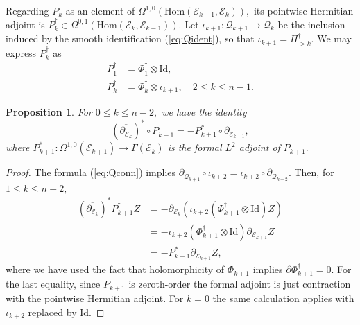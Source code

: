 \documentclass[11pt]{article}
\newtheorem{prop}[theorem]{Proposition}
\theoremstyle{definition}
\numberwithin{equation}{section}
\begin{document}
Regarding $P_k$ as an element of $\Omega^{1,0}(\mathrm{Hom}(\mathcal{E}_{k-1}, \mathcal{E}_k)),$ its pointwise Hermitian adjoint is $P_k^\dagger \in \Omega^{0,1}(\mathrm{Hom}(\mathcal{E}_k, \mathcal{E}_{k-1})).$ Let $\iota_{k+1} : \mathcal{Q}_{k+1} \to \mathcal{Q}_k$ be the inclusion induced by the smooth identification (\ref{eq:Qident}), so that $\iota_{k+1} = \Pi_{>k}^{\dagger}.$ We may express $P_k^\dagger$ as
\begin{equation*}
	\begin{aligned}
		P_1^\dagger & = \Phi_1^\dagger \otimes \mathrm{Id},                          \\
		P_k^\dagger & = \Phi_k^\dagger \otimes \iota_{k+1}, \quad 2 \leq k \leq n-1. 
	\end{aligned}
\end{equation*}

\begin{prop}\label{prop:commutident}
	For $0 \leq k \leq n-2,$ we have the identity
	\begin{equation*}
		(\overline{\partial_{\mathcal{E}_k}})^* \circ P_{k+1}^\dagger = -P_{k+1}^* \circ \partial_{\mathcal{E}_{k+1}},
	\end{equation*}
	where $P_{k+1}^*: \Omega^{1,0}(\mathcal{E}_{k+1}) \to \Gamma(\mathcal{E}_{k})$ is the formal $L^2$ adjoint of $P_{k+1}.$
\end{prop}

\begin{proof}
	The formula (\ref{eq:Qconn}) implies $\partial_{\mathcal{Q}_{k+1}} \circ \iota_{k+2} = \iota_{k+2} \circ \partial_{\mathcal{Q}_{k+2}}.$ Then, for $1 \leq k \leq n-2,$
	\begin{equation*}
		\begin{aligned}
			(\overline{\partial_{\mathcal{E}_k}})^* P_{k+1}^\dagger Z & = - {\partial_{\mathcal{E}_k}}(\iota_{k+2} (\Phi_{k+1}^\dagger \otimes \mathrm{Id}) Z) \\
			    & = -\iota_{k+2} (\Phi_{k+1}^\dagger \otimes \mathrm{Id}) \partial_{\mathcal{E}_{k+1}} Z \\
			    & = -P_{k+1}^* \partial_{\mathcal{E}_{k+1}} Z,                                           
		\end{aligned}
	\end{equation*}
	where we have used the fact that holomorphicity of $\Phi_{k+1}$ implies $\partial \Phi_{k+1}^\dagger = 0.$ For the last equality, since $P_{k+1}$ is zeroth-order the formal adjoint is just contraction with the pointwise Hermitian adjoint. For $k=0$ the same calculation applies with $\iota_{k+2}$ replaced by $\mathrm{Id}$.
\end{proof}
\end{document}
